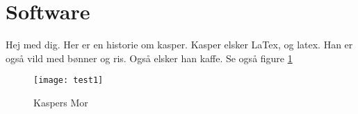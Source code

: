 \documentclass[Main]{subfiles}
\begin{document}
\section{Software} %
\label{sec:software}

Hej med dig.
Her er en historie om kasper.
Kasper elsker LaTex, og latex.
Han er også vild med bønner og ris.
Også elsker han kaffe. 
Se også figure \ref{fig:testimage}  

\begin{figure}[H]
	\centering
	\texttt{[image: test1]}
	\caption{Kaspers Mor}
	\label{fig:testimage}
\end{figure}

\end{document}
